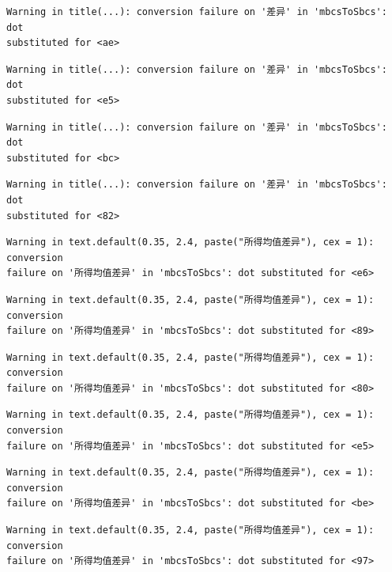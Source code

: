 \documentclass[
  letterpaper,
  DIV=11,
  numbers=noendperiod]{scrreprt}
\begin{document}
\begin{verbatim}
Warning in title(...): conversion failure on '差异' in 'mbcsToSbcs': dot
substituted for <ae>
\end{verbatim}

\begin{verbatim}
Warning in title(...): conversion failure on '差异' in 'mbcsToSbcs': dot
substituted for <e5>
\end{verbatim}

\begin{verbatim}
Warning in title(...): conversion failure on '差异' in 'mbcsToSbcs': dot
substituted for <bc>
\end{verbatim}

\begin{verbatim}
Warning in title(...): conversion failure on '差异' in 'mbcsToSbcs': dot
substituted for <82>
\end{verbatim}

\begin{verbatim}
Warning in text.default(0.35, 2.4, paste("所得均值差异"), cex = 1): conversion
failure on '所得均值差异' in 'mbcsToSbcs': dot substituted for <e6>
\end{verbatim}

\begin{verbatim}
Warning in text.default(0.35, 2.4, paste("所得均值差异"), cex = 1): conversion
failure on '所得均值差异' in 'mbcsToSbcs': dot substituted for <89>
\end{verbatim}

\begin{verbatim}
Warning in text.default(0.35, 2.4, paste("所得均值差异"), cex = 1): conversion
failure on '所得均值差异' in 'mbcsToSbcs': dot substituted for <80>
\end{verbatim}

\begin{verbatim}
Warning in text.default(0.35, 2.4, paste("所得均值差异"), cex = 1): conversion
failure on '所得均值差异' in 'mbcsToSbcs': dot substituted for <e5>
\end{verbatim}

\begin{verbatim}
Warning in text.default(0.35, 2.4, paste("所得均值差异"), cex = 1): conversion
failure on '所得均值差异' in 'mbcsToSbcs': dot substituted for <be>
\end{verbatim}

\begin{verbatim}
Warning in text.default(0.35, 2.4, paste("所得均值差异"), cex = 1): conversion
failure on '所得均值差异' in 'mbcsToSbcs': dot substituted for <97>
\end{verbatim}
\end{document}
